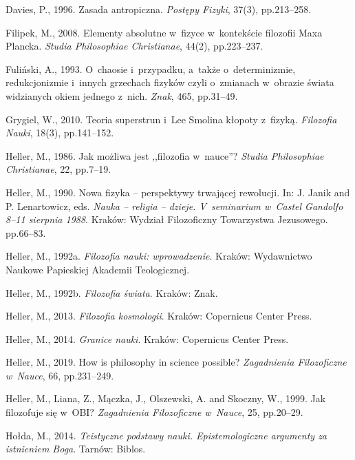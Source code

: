 Davies, P., 1996. Zasada antropiczna. \textit{Postępy Fizyki}, 37(3), pp.213–258.



Filipek, M., 2008. Elementy absolutne w~fizyce w~kontekście filozofii Maxa Plancka. \textit{Studia Philosophiae Christianae}, 44(2), pp.223–237.



Fuliński, A., 1993. O~chaosie i~przypadku, a~także o~determinizmie, redukcjonizmie i~innych grzechach fizyków czyli o~zmianach w~obrazie świata widzianych okiem jednego z~nich. \textit{Znak}, 465, pp.31–49.



Grygiel, W., 2010. Teoria superstrun i~Lee Smolina kłopoty z~fizyką. \textit{Filozofia Nauki}, 18(3), pp.141–152.



Heller, M., 1986. Jak możliwa jest ,,filozofia w~nauce''? \textit{Studia Philosophiae Christianae}, 22, pp.7–19.



Heller, M., 1990. Nowa fizyka -- perspektywy trwającej rewolucji. In: J. Janik and P. Lenartowicz, eds. \textit{Nauka -- religia -- dzieje. V~seminarium w~Castel Gandolfo 8–11 sierpnia 1988}. Kraków: Wydział Filozoficzny Towarzystwa Jezusowego. pp.66–83.



Heller, M., 1992a. \textit{Filozofia nauki: wprowadzenie}. Kraków: Wydawnictwo Naukowe Papieskiej Akademii Teologicznej.



Heller, M., 1992b. \textit{Filozofia świata}. Kraków: Znak.



Heller, M., 2013. \textit{Filozofia kosmologii}. Kraków: Copernicus Center Press.



Heller, M., 2014. \textit{Granice nauki}. Kraków: Copernicus Center Press.



Heller, M., 2019. How is philosophy in science possible? \textit{Zagadnienia Filozoficzne w~Nauce}, 66, pp.231–249.



Heller, M., Liana, Z., Mączka, J., Olszewski, A. and Skoczny, W., 1999. Jak filozofuje się w~OBI? \textit{Zagadnienia Filozoficzne w~Nauce}, 25, pp.20–29.



Hołda, M., 2014. \textit{Teistyczne podstawy nauki. Epistemologiczne argumenty za istnieniem Boga}. Tarnów: Biblos.



